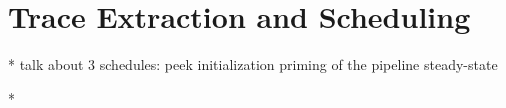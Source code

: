 \section{Trace Extraction and Scheduling}
\label{sec:traces}

* talk about 3 schedules:  
	peek initialization
	priming of the pipeline
	steady-state

*